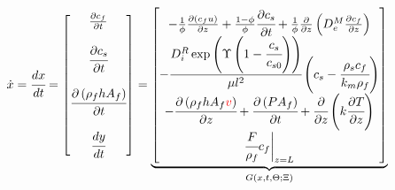 \documentclass[a0,portrait]{a0poster}
\begin{document}
\begin{multicols}{2}
\begin{tcolorbox}[width=\linewidth, boxrule=0mm, sharp corners=all, colback=white]
\begin{align*}
	\dot{x} = \cfrac{d x}{d t} = 
	\begin{bmatrix}
		\frac{\partial c_f}{\partial t} \\
		\\
		\cfrac{\partial c_s}{\partial t} \\
		\\
		\cfrac{\partial \left(\rho_f h A_f\right)}{\partial t} \\
		\\
		\cfrac{d y}{d t}
	\end{bmatrix}
	=
\underbrace{\begin{bmatrix}
		-\frac{1}{\phi} \frac{\partial \left( c_f u\right)}{\partial z} + \frac{1-\phi}{\phi} \cfrac{\partial c_s}{\partial t} + \frac{1}{\phi} \frac{\partial}{\partial z} \left( D^M_e \frac{\partial c_f}{\partial z} \right) \\
		-\cfrac{ D_i^R \exp \left( \Upsilon \left( 1-\cfrac{ c_s }{c_{s0}} \right) \right) }{ \mu l^2 } \left( c_s  - \cfrac{\rho_s c_f }{ k_m \rho_f }  \right) \\
		- \cfrac{\partial \left( \rho_f h A_f {\color{red}v} \right)}{\partial z} + \cfrac{\partial \left(P A_f\right)}{\partial t} + \cfrac{\partial}{\partial z} \left( k \cfrac{\partial T}{\partial z} \right) \\
		\cfrac{F}{\rho_f} c_f \biggr\rvert_{z=L}
	\end{bmatrix}}_{G(x,t,\Theta;\Xi)}
\end{align*}


\end{tcolorbox}
\end{multicols}
\end{document}
